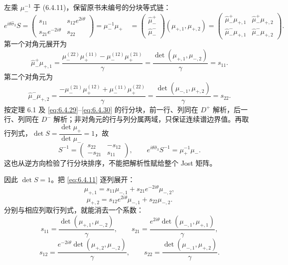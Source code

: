\documentclass[lang=cn,scheme=chinese,mode=simple,device=normal,color=blue,
math=cm,thmcnt=section,12pt]{elegantbook}
\newcommand{\eqq}[2]{\tag{#1}\label{eq:#1}#2}
\begin{document}
\begin{callout}[计算：散射矩阵行乘列的完整展开及解析性]
    左乘 $\mu_-^{-1}$ 于 (6.4.11)，保留原书未编号的分块等式链：
    \[
        e^{i\theta\widehat\sigma_3}S
        =\begin{pmatrix}s_{11}&s_{12}e^{2i\theta}\\s_{21}e^{-2i\theta}&s_{22}\end{pmatrix}
        =\mu_-^{-1}\mu_+\quad
        =\begin{pmatrix}\widehat\mu_-^+\\\widehat\mu_-^-\end{pmatrix}(\mu_{+,1},\mu_{+,2})
        =\begin{pmatrix}\widehat\mu_-^+\mu_{+,1} & \widehat\mu_-^+\mu_{+,2} \\
               \widehat\mu_-^-\mu_{+,1} & \widehat\mu_-^-\mu_{+,2}\end{pmatrix}.
    \]
    第一个对角元展开为
    \[
        \widehat\mu_-^+\mu_{+,1}=\dfrac{\mu_-^{(22)}\mu_+^{(11)}-\mu_-^{(12)}\mu_+^{(21)}}{\gamma}
        =\dfrac{\det(\mu_{+,1},\mu_{-,2})}{\gamma}=s_{11}.
    \]
    第二个对角元为
    \[
        \widehat\mu_-^-\mu_{+,2}=\dfrac{-\mu_-^{(21)}\mu_+^{(12)}+\mu_-^{(11)}\mu_+^{(22)}}{\gamma}
        =\dfrac{\det(\mu_{-,1},\mu_{+,2})}{\gamma}=s_{22}.
    \]
    按定理 6.1 及 \eqref{eq:6.4.29}--\eqref{eq:6.4.30} 的行分块，前一行、列同在 $D^+$ 解析，后一行、列同在 $D^-$ 解析；非对角元的行与列分属两域，只保证连续谱边界值。再取行列式，$\det S=\dfrac{\det\mu_+}{\det\mu_-}=1$，故
    \[
        S^{-1}=\begin{pmatrix}s_{22}&-s_{12}\\-s_{21}&s_{11}\end{pmatrix},\qquad
        e^{i\theta\widehat\sigma_3}S^{-1}=\mu_+^{-1}\mu_-.
    \]
    这也从逆方向检验了行分块排序，不能把解析性赋给整个 Jost 矩阵。
\end{callout}

因此 $\det S=1$。把 \eqref{eq:6.4.11} 逐列展开：
\begin{equation}\eqq{6.4.31}{\mu_{+,1}=s_{11}\mu_{-,1}+s_{21}e^{-2i\theta}\mu_{-,2},}\end{equation}
\begin{equation}\eqq{6.4.32}{\mu_{+,2}=s_{12}e^{2i\theta}\mu_{-,1}+s_{22}\mu_{-,2}.}\end{equation}
分别与相应列取行列式，就能消去一个系数：
\begin{equation}\eqq{6.4.33}{s_{11}=\dfrac{\det(\mu_{+,1},\mu_{-,2})}{\gamma},\qquad
        s_{21}=\dfrac{e^{2i\theta}\det(\mu_{-,1},\mu_{+,1})}{\gamma},}\end{equation}
\begin{equation}\eqq{6.4.34}{s_{12}=\dfrac{e^{-2i\theta}\det(\mu_{+,2},\mu_{-,2})}{\gamma},\qquad
        s_{22}=\dfrac{\det(\mu_{-,1},\mu_{+,2})}{\gamma}.}\end{equation}
\end{document}

